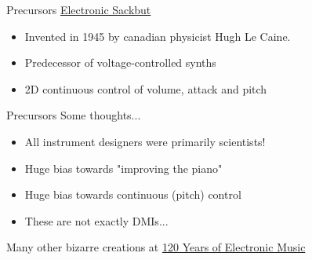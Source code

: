 \documentclass{beamer}
\begin{document}
\begin{frame}{Precursors}
    \href{https://www.youtube.com/watch?v=yfpKj5KpneA}{Electronic Sackbut}
    \vspace{5mm}
    \begin{itemize}
        \item Invented in 1945 by canadian physicist Hugh Le Caine.
        \item Predecessor of voltage-controlled synths
        \item 2D continuous control of volume, attack and pitch
    \end{itemize}
\end{frame}

\begin{frame}{Precursors}
    Some thoughts...
    \vspace{5mm}
    \begin{itemize}
        \item All instrument designers were primarily scientists!
        \item Huge bias towards "improving the piano"
        \item Huge bias towards continuous (pitch) control
        \item These are not exactly DMIs...
    \end{itemize}
    \vspace{5mm}
    Many other bizarre creations at \href{http://120years.net/}{120 Years of Electronic Music}
\end{frame}
\end{document}
